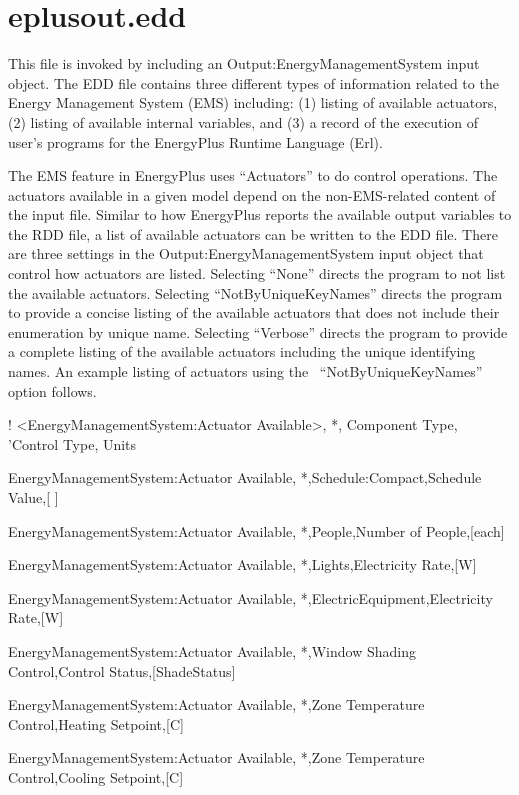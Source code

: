 \section{eplusout.edd}\label{eplusout.edd}

This file is invoked by including an Output:EnergyManagementSystem input object. The EDD file contains three different types of information related to the Energy Management System (EMS) including: (1) listing of available actuators, (2) listing of available internal variables, and (3) a record of the execution of user's programs for the EnergyPlus Runtime Language (Erl).

The EMS feature in EnergyPlus uses ``Actuators'' to do control operations. The actuators available in a given model depend on the non-EMS-related content of the input file. Similar to how EnergyPlus reports the available output variables to the RDD file, a list of available actuators can be written to the EDD file. There are three settings in the Output:EnergyManagementSystem input object that control how actuators are listed. Selecting ``None'' directs the program to not list the available actuators. Selecting ``NotByUniqueKeyNames'' directs the program to provide a concise listing of the available actuators that does not include their enumeration by unique name. Selecting ``Verbose'' directs the program to provide a complete listing of the available actuators including the unique identifying names. An example listing of actuators using the~ ``NotByUniqueKeyNames''~ option follows.

! \textless{}EnergyManagementSystem:Actuator Available\textgreater{}, *, Component Type, 'Control Type, Units

EnergyManagementSystem:Actuator Available, *,Schedule:Compact,Schedule Value,{[} {]}

EnergyManagementSystem:Actuator Available, *,People,Number of People,{[}each{]}

EnergyManagementSystem:Actuator Available, *,Lights,Electricity Rate,{[}W{]}

EnergyManagementSystem:Actuator Available, *,ElectricEquipment,Electricity Rate,{[}W{]}

EnergyManagementSystem:Actuator Available, *,Window Shading Control,Control Status,{[}ShadeStatus{]}

EnergyManagementSystem:Actuator Available, *,Zone Temperature Control,Heating Setpoint,{[}C{]}

EnergyManagementSystem:Actuator Available, *,Zone Temperature Control,Cooling Setpoint,{[}C{]}

